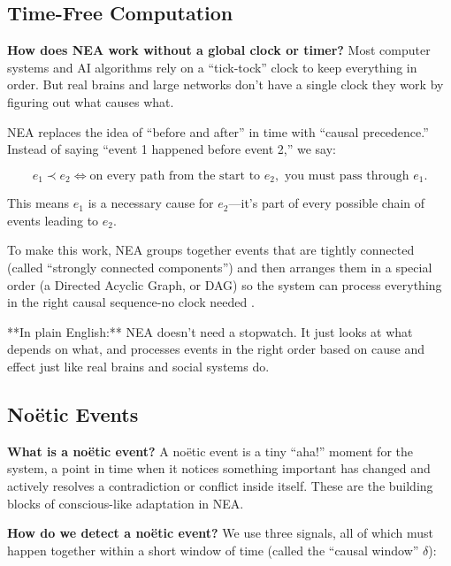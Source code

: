 \documentclass[11pt]{article}
\begin{document}
\subsection{Time-Free Computation}

\textbf{How does NEA work without a global clock or timer?}  
Most computer systems and AI algorithms rely on a “tick-tock” clock to keep everything in order. But real brains and large networks don’t have a single clock they work by figuring out what causes what.

NEA replaces the idea of “before and after” in time with “causal precedence.”  
Instead of saying “event 1 happened before event 2,” we say:

\[
  e_1 \prec e_2 \iff \text{on every path from the start to } e_2, \text{ you must pass through } e_1.
\]

This means $e_1$ is a necessary cause for $e_2$—it’s part of every possible chain of events leading to $e_2$.

To make this work, NEA groups together events that are tightly connected (called “strongly connected components”) and then arranges them in a special order (a Directed Acyclic Graph, or DAG) so the system can process everything in the right causal sequence-no clock needed \cite{lamport1978}.

**In plain English:**  
NEA doesn’t need a stopwatch. It just looks at what depends on what, and processes events in the right order based on cause and effect just like real brains and social systems do.

\subsection{No\"etic Events}

\textbf{What is a noëtic event?}  
A noëtic event is a tiny “aha!” moment for the system, a point in time when it notices something important has changed and actively resolves a contradiction or conflict inside itself. These are the building blocks of conscious-like adaptation in NEA.

\textbf{How do we detect a noëtic event?}  
We use three signals, all of which must happen together within a short window of time (called the “causal window” $\delta$):
\end{document}
